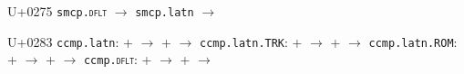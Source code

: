 \documentclass{article}
\begin{document}
\begin{substitutions}
\goodbreak

U+0275  \linebreak
    \texttt{smcp.\textsc{dflt}} $\to$  \linebreak
    \texttt{smcp.latn} $\to$  

\goodbreak

U+0283  \linebreak
    \texttt{ccmp.latn}:
\linebreak\null\quad{} \space +  \space $\to$  
\linebreak\null\quad{} \space +  \space $\to$  
\linebreak
\texttt{ccmp.latn.TRK}:
\linebreak\null\quad{} \space +  \space $\to$  
\linebreak\null\quad{} \space +  \space $\to$  
\linebreak
\texttt{ccmp.latn.ROM}:
\linebreak\null\quad{} \space +  \space $\to$  
\linebreak\null\quad{} \space +  \space $\to$  
\linebreak
\texttt{ccmp.\textsc{dflt}}:
\linebreak\null\quad{} \space +  \space $\to$  
\linebreak\null\quad{} \space +  \space $\to$  


\goodbreak


\end{substitutions}
\end{document}
